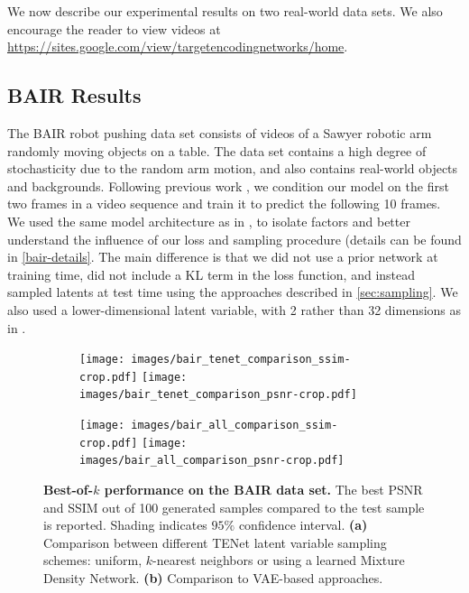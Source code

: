 \documentclass{article}
\newcommand{\modelname}{TENet }
\begin{document}
We now describe our experimental results on two real-world data sets.
We also encourage the reader to view videos at \url{https://sites.google.com/view/targetencodingnetworks/home}.

\subsection{BAIR Results}

The BAIR robot pushing data set \citep{Ebert17} consists of videos of a Sawyer robotic arm randomly moving objects on a table.
The data set contains a high degree of stochasticity due to the random arm motion, and also contains real-world objects and backgrounds.
Following previous work \citep{Babaeizadeh2018, Denton2018}, we condition our model on the first two frames in a video sequence and train it to predict the following 10 frames.
We used the same model architecture as in \citep{Denton2018}, to isolate factors and better understand the influence of our loss and sampling procedure (details can be found in \cref{bair-details}.
The main difference is that we did not use a prior network at training time, did not include a KL term in the loss function, and instead sampled latents at test time using the approaches described in \cref{sec:sampling}.
We also used a lower-dimensional latent variable, with 2 rather than 32 dimensions as in \citep{Denton2018}.

\begin{figure}
  \centering
  \begin{subfigure}[b]{0.49 \textwidth}
    \texttt{[image: images/bair\_tenet\_comparison\_ssim-crop.pdf]}
    \texttt{[image: images/bair\_tenet\_comparison\_psnr-crop.pdf]}
    \caption{}
  \end{subfigure}
  \begin{subfigure}[b]{0.49 \textwidth}
    \texttt{[image: images/bair\_all\_comparison\_ssim-crop.pdf]}
    \texttt{[image: images/bair\_all\_comparison\_psnr-crop.pdf]}
    \caption{}
  \end{subfigure}
  \caption{
    \textbf{Best-of-$k$ performance on the BAIR data set.}
    The best PSNR and SSIM out of 100 generated samples compared to the test sample is reported.
    Shading indicates $95\%$ confidence interval.
    \textbf{(a)} Comparison between different \modelname latent variable sampling schemes: uniform, $k$-nearest neighbors or using a learned Mixture Density Network.
    \textbf{(b)} Comparison to VAE-based approaches.
  }
  \label{bair}
\end{figure}
\end{document}
